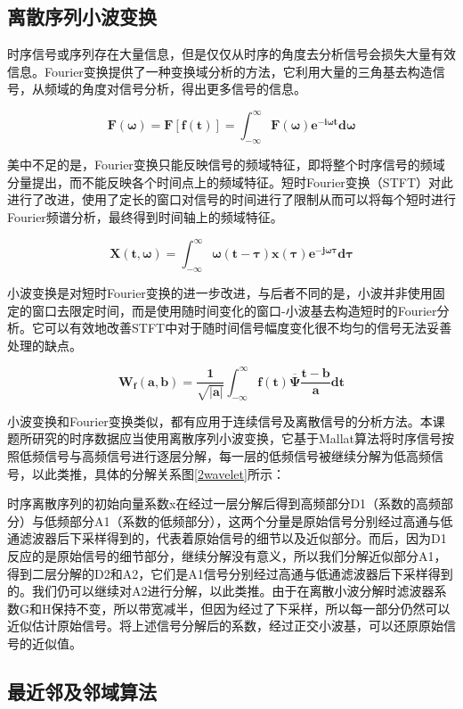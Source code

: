 \documentclass[a4paper,AutoFakeBold,oneside,12pt]{book}
\begin{document}
\subsection{离散序列小波变换}

	时序信号或序列存在大量信息，但是仅仅从时序的角度去分析信号会损失大量有效信息。Fourier变换提供了一种变换域分析的方法，它利用大量的三角基去构造信号，从频域的角度对信号分析，得出更多信号的信息。

	$$\bm{F(\omega)}=\bm{F[f(t)]}=\bm{\int_{-\infty}^{\infty} F(\omega)e^{-i\omega t} d\omega}$$

	美中不足的是，Fourier变换只能反映信号的频域特征，即将整个时序信号的频域分量提出，而不能反映各个时间点上的频域特征。短时Fourier变换（STFT）对此进行了改进，使用了定长的窗口对信号的时间进行了限制从而可以将每个短时进行Fourier频谱分析，最终得到时间轴上的频域特征。

	$$\bm{X(t,\omega)}=\bm{\int_{-\infty}^{\infty} \omega(t-\tau)x(\tau)e^{-j\omega\tau} d\tau}$$

	小波变换是对短时Fourier变换的进一步改进，与后者不同的是，小波并非使用固定的窗口去限定时间，而是使用随时间变化的窗口-小波基去构造短时的Fourier分析。它可以有效地改善STFT中对于随时间信号幅度变化很不均匀的信号无法妥善处理的缺点。

	$$\bm{W_f (a,b)}=\bm{\frac{1}{\sqrt{|a|}}\int_{-\infty}^{\infty}f(t)\overline{\Psi}\frac{t-b}{a}dt}$$

	小波变换和Fourier变换类似，都有应用于连续信号及离散信号的分析方法。本课题所研究的时序数据应当使用离散序列小波变换，它基于Mallat算法将时序信号按照低频信号与高频信号进行逐层分解，每一层的低频信号被继续分解为低高频信号，以此类推，具体的分解关系图\ref{2wavelet}所示：


	时序离散序列的初始向量系数x在经过一层分解后得到高频部分D1（系数的高频部分）与低频部分A1（系数的低频部分），这两个分量是原始信号分别经过高通与低通滤波器后下采样得到的，代表着原始信号的细节以及近似部分。而后，因为D1反应的是原始信号的细节部分，继续分解没有意义，所以我们分解近似部分A1，得到二层分解的D2和A2，它们是A1信号分别经过高通与低通滤波器后下采样得到的。我们仍可以继续对A2进行分解，以此类推。由于在离散小波分解时滤波器系数G和H保持不变，所以带宽减半，但因为经过了下采样，所以每一部分仍然可以近似估计原始信号。将上述信号分解后的系数，经过正交小波基，可以还原原始信号的近似值。

\subsection{最近邻及邻域算法}
\end{document}
